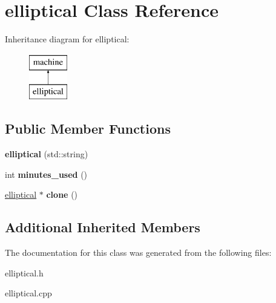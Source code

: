 \hypertarget{classelliptical}{\section{elliptical Class Reference}
\label{classelliptical}
}
Inheritance diagram for elliptical\-:\begin{figure}[H]
\begin{center}
\leavevmode
\includegraphics[height=2.000000cm]{classelliptical}
\end{center}
\end{figure}
\subsection*{Public Member Functions}
\begin{DoxyCompactItemize}
\item 
\hypertarget{classelliptical_a153950b979314afec447613cb9507a12}{{\bfseries elliptical} (std\-::string)}\label{classelliptical_a153950b979314afec447613cb9507a12}

\item 
\hypertarget{classelliptical_a5f61178049918ae5d91d53efec0eb906}{int {\bfseries minutes\-\_\-used} ()}\label{classelliptical_a5f61178049918ae5d91d53efec0eb906}

\item 
\hypertarget{classelliptical_ae0946ae0827c2941fc692fbadc94a77d}{\hyperlink{classelliptical}{elliptical} $\ast$ {\bfseries clone} ()}\label{classelliptical_ae0946ae0827c2941fc692fbadc94a77d}

\end{DoxyCompactItemize}
\subsection*{Additional Inherited Members}


The documentation for this class was generated from the following files\-:\begin{DoxyCompactItemize}
\item 
elliptical.\-h\item 
elliptical.\-cpp\end{DoxyCompactItemize}
